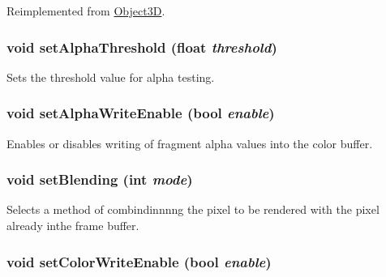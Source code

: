 Reimplemented from \hyperlink{classm3g_1_1Object3D_1efcb1973989d9963d5bd6d03065d389}{Object3D}.\hypertarget{classm3g_1_1CompositingMode_6becafaefd18a2b8b1adeba491576837}{
\subsubsection[{setAlphaThreshold}]{\setlength{\rightskip}{0pt plus 5cm}void setAlphaThreshold (float {\em threshold})}}
\label{classm3g_1_1CompositingMode_6becafaefd18a2b8b1adeba491576837}


Sets the threshold value for alpha testing. \hypertarget{classm3g_1_1CompositingMode_5204f1acac056f82d322262703be67b0}{
\subsubsection[{setAlphaWriteEnable}]{\setlength{\rightskip}{0pt plus 5cm}void setAlphaWriteEnable (bool {\em enable})}}
\label{classm3g_1_1CompositingMode_5204f1acac056f82d322262703be67b0}


Enables or disables writing of fragment alpha values into the color buffer. \hypertarget{classm3g_1_1CompositingMode_4c09465dfec9efa000c115c5c2867b63}{
\subsubsection[{setBlending}]{\setlength{\rightskip}{0pt plus 5cm}void setBlending (int {\em mode})}}
\label{classm3g_1_1CompositingMode_4c09465dfec9efa000c115c5c2867b63}


Selects a method of combindinnnng the pixel to be rendered with the pixel already inthe frame buffer. \hypertarget{classm3g_1_1CompositingMode_84f7cba08f5a2bea05de4fc3154a50b2}{
\subsubsection[{setColorWriteEnable}]{\setlength{\rightskip}{0pt plus 5cm}void setColorWriteEnable (bool {\em enable})}}
\label{classm3g_1_1CompositingMode_84f7cba08f5a2bea05de4fc3154a50b2}


